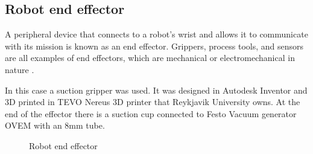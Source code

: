\subsection{Robot end effector\label{subsec:robotend}}
A peripheral device that connects to a robot's wrist and allows it to communicate with its mission is known as an end effector. Grippers, process tools, and sensors are all examples of end effectors, which are mechanical or electromechanical in nature \cite{wilson_relative_1996}. 

In this case a suction gripper was used. It was designed in Autodesk Inventor \cite{noauthor_inventor_nodate} and 3D printed in TEVO Nereus 3D printer that Reykjavik University owns. At the end of the effector there is a suction cup connected to Festo Vacuum generator OVEM with an 8mm tube.
\begin{figure}[ht]
    \centering
    \hfill
    \caption{Robot end effector}
    \label{figure: endeffector}
\end{figure}

